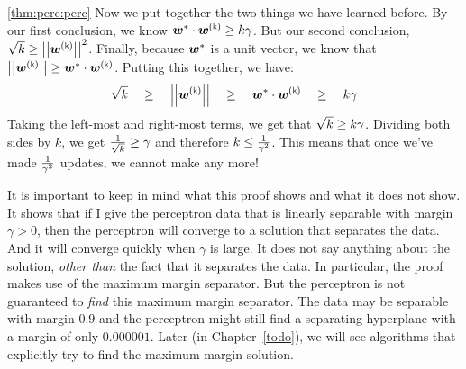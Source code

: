 \documentclass[trans]{beamer}
\begin{document}
\begin{myproof}{\ref{thm:perc:perc}}
  Now we put together the two things we have learned before.  By our
  first conclusion, we know $\dotp{\vw^*}{\vw\kth} \geq k \ga$.  But
  our second conclusion, $\sqrt{k} \geq \norm{\vw\kth}^2$.  Finally,
  because ${\boldsymbol{w}}^*$ is a unit vector, we know that $\norm{\vw\kth} \geq
  \dotp{\vw^*}{\vw\kth}$.  Putting this together, we have:
  \begin{equation}
    \sqrt k 
    \quad\geq\quad
    \norm{\vw\kth}
    \quad\geq\quad
    \dotp{\vw^*}{\vw\kth}
    \quad\geq\quad
    k\ga
  \end{equation}
  Taking the left-most and right-most terms, we get that $\sqrt{k}
  \geq k \gamma$.  Dividing both sides by $k$, we get $\frac 1 {\sqrt{k}}
  \geq \gamma$ and therefore $k \leq \frac 1 {\gamma^2}$.  This means
  that once we've made $\frac 1 {\gamma^2}$ updates, we cannot make
  any more!
\end{myproof}



It is important to keep in mind what this proof shows and what it does
not show.  It shows that if I give the perceptron data that is
linearly separable with margin $\gamma > 0$, then the perceptron will
converge to a solution that separates the data.  And it will converge
quickly when $\gamma$ is large.  It does not say anything about the
solution, \emph{other than} the fact that it separates the data.  In
particular, the proof makes use of the maximum margin separator.  But
the perceptron is not guaranteed to \emph{find} this maximum margin
separator.  The data may be separable with margin $0.9$ and the
perceptron might still find a separating hyperplane with a margin of
only $0.000001$.  Later (in Chapter~\ref{todo}), we will see
algorithms that explicitly try to find the maximum margin solution.

\fi
\end{document}
